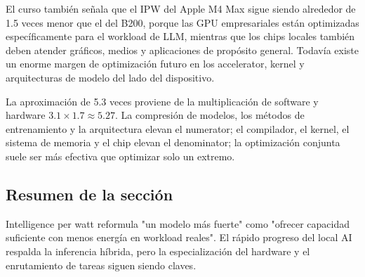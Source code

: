 El curso también señala que el IPW del Apple M4 Max sigue siendo alrededor de 1.5 veces menor que el del B200, porque las GPU empresariales están optimizadas específicamente para el workload de LLM, mientras que los chips locales también deben atender gráficos, medios y aplicaciones de propósito general. Todavía existe un enorme margen de optimización futuro en los accelerator, kernel y arquitecturas de modelo del lado del dispositivo.

\begin{knowledgebox}{La aproximación de 5.3 veces proviene de la multiplicación de software y hardware}
$3.1\times1.7\approx5.27$. La compresión de modelos, los métodos de entrenamiento y la arquitectura elevan el numerator; el compilador, el kernel, el sistema de memoria y el chip elevan el denominator; la optimización conjunta suele ser más efectiva que optimizar solo un extremo.
\end{knowledgebox}

\subsection{Resumen de la sección}

Intelligence per watt reformula "un modelo más fuerte" como "ofrecer capacidad suficiente con menos energía en workload reales". El rápido progreso del local AI respalda la inferencia híbrida, pero la especialización del hardware y el enrutamiento de tareas siguen siendo claves.
